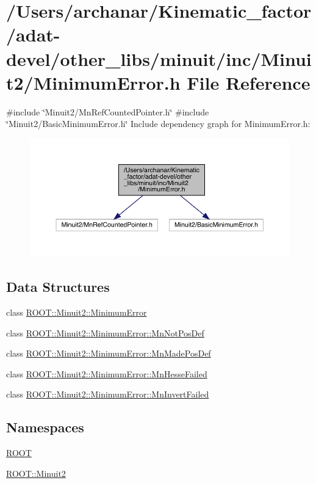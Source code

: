 \hypertarget{adat-devel_2other__libs_2minuit_2inc_2Minuit2_2MinimumError_8h}{}\section{/\+Users/archanar/\+Kinematic\+\_\+factor/adat-\/devel/other\+\_\+libs/minuit/inc/\+Minuit2/\+Minimum\+Error.h File Reference}
\label{adat-devel_2other__libs_2minuit_2inc_2Minuit2_2MinimumError_8h}
{\ttfamily \#include \char`\"{}Minuit2/\+Mn\+Ref\+Counted\+Pointer.\+h\char`\"{}}\newline
{\ttfamily \#include \char`\"{}Minuit2/\+Basic\+Minimum\+Error.\+h\char`\"{}}\newline
Include dependency graph for Minimum\+Error.\+h\+:
\nopagebreak
\begin{figure}[H]
\begin{center}
\leavevmode
\includegraphics[width=350pt]{de/db7/adat-devel_2other__libs_2minuit_2inc_2Minuit2_2MinimumError_8h__incl}
\end{center}
\end{figure}
\subsection*{Data Structures}
\begin{DoxyCompactItemize}
\item 
class \mbox{\hyperlink{classROOT_1_1Minuit2_1_1MinimumError}{R\+O\+O\+T\+::\+Minuit2\+::\+Minimum\+Error}}
\item 
class \mbox{\hyperlink{classROOT_1_1Minuit2_1_1MinimumError_1_1MnNotPosDef}{R\+O\+O\+T\+::\+Minuit2\+::\+Minimum\+Error\+::\+Mn\+Not\+Pos\+Def}}
\item 
class \mbox{\hyperlink{classROOT_1_1Minuit2_1_1MinimumError_1_1MnMadePosDef}{R\+O\+O\+T\+::\+Minuit2\+::\+Minimum\+Error\+::\+Mn\+Made\+Pos\+Def}}
\item 
class \mbox{\hyperlink{classROOT_1_1Minuit2_1_1MinimumError_1_1MnHesseFailed}{R\+O\+O\+T\+::\+Minuit2\+::\+Minimum\+Error\+::\+Mn\+Hesse\+Failed}}
\item 
class \mbox{\hyperlink{classROOT_1_1Minuit2_1_1MinimumError_1_1MnInvertFailed}{R\+O\+O\+T\+::\+Minuit2\+::\+Minimum\+Error\+::\+Mn\+Invert\+Failed}}
\end{DoxyCompactItemize}
\subsection*{Namespaces}
\begin{DoxyCompactItemize}
\item 
 \mbox{\hyperlink{namespaceROOT}{R\+O\+OT}}
\item 
 \mbox{\hyperlink{namespaceROOT_1_1Minuit2}{R\+O\+O\+T\+::\+Minuit2}}
\end{DoxyCompactItemize}
